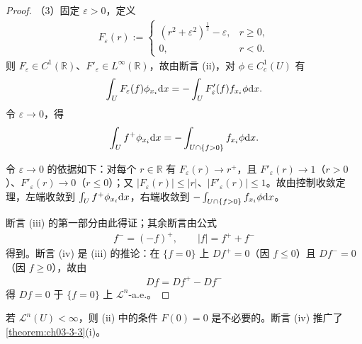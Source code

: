 \documentclass[../../main.tex]{subfiles}%
\begin{document}
\begin{proof}
（3）固定 $\varepsilon>0$，定义
\begin{align*}
F_\varepsilon(r):=
\begin{cases}
(r^2+\varepsilon^2)^{\frac12}-\varepsilon, & r\geqslant0,\\
0, & r<0.
\end{cases}
\end{align*}
则 $F_\varepsilon\in C^1(\mathbb{R})$、$F'_\varepsilon\in L^\infty(\mathbb{R})$，故由断言 (ii)，对 $\phi\in C_c^1(U)$ 有
\begin{align*}
\int_U F_\varepsilon(f)\phi_{x_i}\mathrm{d} x=-\int_U F'_\varepsilon(f)f_{x_i}\phi\mathrm{d} x.
\end{align*}
令 $\varepsilon\to0$，得
\begin{align*}
\int_U f^+\phi_{x_i}\mathrm{d} x=-\int_{U\cap\{f>0\}}f_{x_i}\phi\mathrm{d} x.
\end{align*}

令 $\varepsilon\to0$ 的依据如下：对每个 $r\in\mathbb{R}$ 有 $F_\varepsilon(r)\to r^+$，且 $F'_\varepsilon(r)\to1$（$r>0$）、$F'_\varepsilon(r)\to0$（$r\leqslant0$）；又 $\lvert F_\varepsilon(r)\rvert\leqslant\lvert r\rvert$、$\lvert F'_\varepsilon(r)\rvert\leqslant1$。故由控制收敛定理，左端收敛到 $\int_Uf^+\phi_{x_i}\mathrm{d} x$，右端收敛到 $-\int_{U\cap\{f>0\}}f_{x_i}\phi\mathrm{d} x$。%

断言 (iii) 的第一部分由此得证；其余断言由公式
\begin{align*}
f^-=(-f)^+,\qquad\lvert f\rvert=f^++f^-
\end{align*}
得到。断言 (iv) 是 (iii) 的推论：在 $\{f=0\}$ 上 $Df^+=0$（因 $f\leqslant0$）且 $Df^-=0$（因 $f\geqslant0$），故由
\begin{align*}
Df=Df^+-Df^-
\end{align*}
得 $Df=0$ 于 $\{f=0\}$ 上 $\mathcal{L}^n$-a.e.。
\end{proof}

\begin{remark}\label{remark:ch04-thm-4-4-推广}
若 $\mathcal{L}^n(U)<\infty$，则 (ii) 中的条件 $F(0)=0$ 是不必要的。断言 (iv) 推广了\cref{theorem:ch03-3-3}(i)。%
\end{remark}
\end{document}
